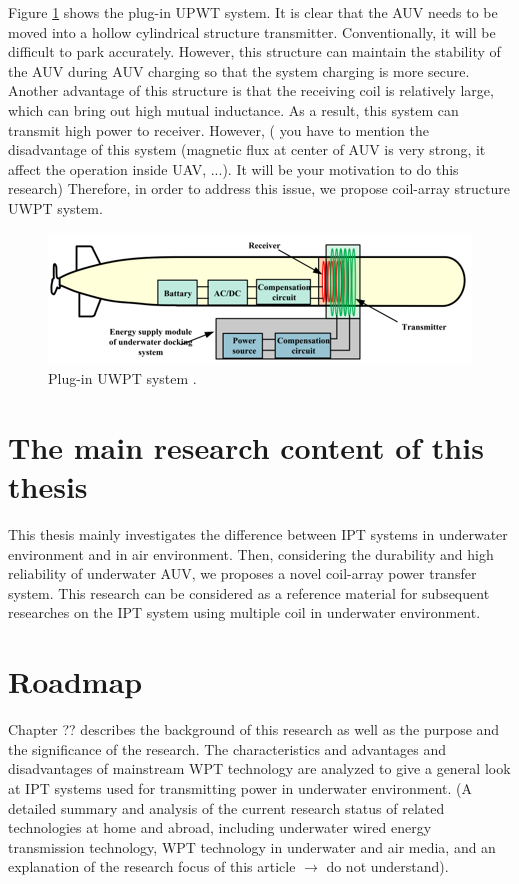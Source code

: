 Figure \ref{fig:plug in UWPT system} shows the plug-in UPWT system. 
It is clear that the AUV needs to be moved into a hollow cylindrical structure transmitter.
Conventionally, it will be difficult to park accurately. 
However, this structure can maintain the stability of the AUV during AUV charging so that the system charging is more secure. 
Another advantage of this structure is that the receiving coil is relatively large, which can bring out high mutual inductance. 
As a result, this system can transmit high power to receiver.
However, ({\color{red} you have to mention the disadvantage of this system (magnetic flux at center of AUV is very strong, it affect the operation inside UAV, ...). It will be your motivation to do this research})
Therefore, in order to address this issue, we propose coil-array structure UWPT system.
\begin{figure}[!t]
    \centering
    \includegraphics[width=0.7\linewidth]{images/1_plugin_UWPT_system.png}
    \caption{Plug-in UWPT system \cite{Wang2019}.}
    \label{fig:plug in UWPT system}
\end{figure}


\section{The main research content of this thesis}
This thesis mainly investigates the difference between IPT systems in underwater environment and in air environment. 
Then, considering the durability and high reliability of underwater AUV, we proposes a novel coil-array power transfer system. 
This research can be considered as a reference material for subsequent researches on the IPT system using multiple coil in underwater environment.

\section{Roadmap}
Chapter ?? describes the background of this research as well as the purpose and the significance of the research.
The characteristics and advantages and disadvantages of mainstream WPT technology are analyzed to give a general look at IPT systems used for transmitting power in underwater environment. 
(A detailed summary and analysis of the current research status of related technologies at home and abroad, including underwater wired energy transmission technology, WPT technology in underwater and air media, and an explanation of the research focus of this article $\rightarrow$ do not understand).

